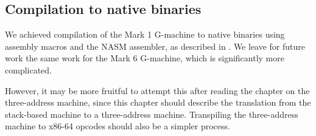 \subsection{Compilation to native binaries}
\label{sec:future-work-compilation}

We achieved compilation of the Mark 1 G-machine to native binaries using assembly macros and the NASM assembler, as described in . We leave for future work the same work for the Mark 6 G-machine, which is significantly more complicated.

However, it may be more fruitful to attempt this after reading the chapter on the three-address machine, since this chapter should describe the translation from the stack-based machine to a three-address machine. Transpiling the three-address machine to x86-64 opcodes should also be a simpler process.

